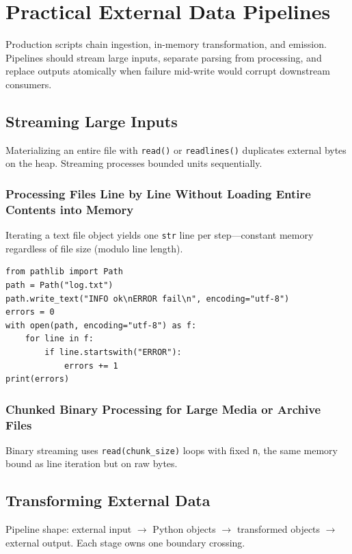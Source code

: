 \documentclass[a4paper,twoside]{report}
\begin{document}
\section{Practical External Data Pipelines}

Production scripts chain ingestion, in-memory transformation, and emission. Pipelines should stream large inputs, separate parsing from processing, and replace outputs atomically when failure mid-write would corrupt downstream consumers.


\subsection{Streaming Large Inputs}

Materializing an entire file with \texttt{read()} or \texttt{readlines()} duplicates external bytes on the heap. Streaming processes bounded units sequentially.

\subsubsection{Processing Files Line by Line Without Loading Entire Contents into Memory}

Iterating a text file object yields one \texttt{str} line per step---constant memory regardless of file size (modulo line length).

\begin{verbatim}
from pathlib import Path
path = Path("log.txt")
path.write_text("INFO ok\nERROR fail\n", encoding="utf-8")
errors = 0
with open(path, encoding="utf-8") as f:
    for line in f:
        if line.startswith("ERROR"):
            errors += 1
print(errors)
\end{verbatim}

\subsubsection{Chunked Binary Processing for Large Media or Archive Files}

Binary streaming uses \texttt{read(chunk\_size)} loops with fixed \texttt{n}, the same memory bound as line iteration but on raw bytes.


\subsection{Transforming External Data}

Pipeline shape: external input $\rightarrow$ Python objects $\rightarrow$ transformed objects $\rightarrow$ external output. Each stage owns one boundary crossing.
\end{document}
